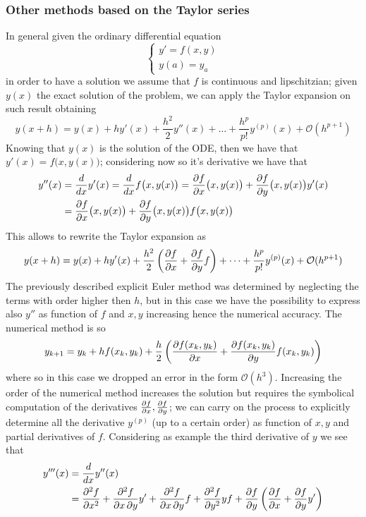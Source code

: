 	\subsubsection{Other methods based on the Taylor series}
		In general given the ordinary differential equation
		\[ \begin{cases}
			y' = f(x,y) \\ y(a) = y_a
		\end{cases} \]
		in order to have a solution we assume that $f$ is continuous and lipschitzian; given $y(x)$ the exact solution of the problem, we can apply the Taylor expansion on such result obtaining
		\[ y(x+h) = y(x) + h y'(x) + \frac{h^2}{2} y''(x) + \dots + \frac{h^p}{p!} y^{(p)} (x) + \mathcal O(h^{p+1}) \]
		Knowing that $y(x)$ is the solution of the ODE, then we have that $y'(x) = f\big(x,y(x)\big)$; considering now so it's derivative we have that
		\begin{align*}
			y''(x) & = \frac d{dx} y'(x)  = \frac d{dx} f\big(x,y(x)\big) = \frac{\partial f}{\partial x} \big(x,y(x)\big) + \frac{\partial f}{\partial y}\big(x,y(x)\big) y'(x) \\
			& = \frac{\partial f}{\partial x} \big(x,y(x)\big) + \frac{\partial f}{\partial y}\big(x,y(x)\big) f\big(x,y(x)\big)
		\end{align*}
		This allows to rewrite the Taylor expansion as
		\[ y(x+h) = y(x) + h y'(x) + \frac{h^2}{2} \left(\frac{\partial f}{\partial x} + \frac{\partial f}{\partial y} f \right) + \dots + \frac{h^p}{p!} y^{(p)} (x) + \mathcal O(h^{p+1}) \]
		The previously described explicit Euler method was determined by neglecting the terms with order higher then $h$, but in this case we have the possibility to express also $y''$ as function of $f$ and $x,y$ increasing hence the numerical accuracy. The numerical method is so
		\begin{equation} \label{eq:ode:eulersecond}
			y_{k+1} = y_k + h f(x_k,y_k) + \frac h 2 \left( \frac{\partial f(x_k,y_k)}{\partial x} + \frac{\partial f(x_k,y_k)}{\partial y} f(x_k,y_k) \right)
		\end{equation}
		where so in this case we dropped an error in the form $\mathcal O(h^3)$. Increasing the order of the numerical method increases the solution but requires the symbolical computation of the derivatives $\frac{\partial f}{\partial x},\frac{\partial f}{\partial y}$; we can carry on the process to explicitly determine all the derivative $y^{(p)}$ (up to a certain order) as function of $x,y$ and partial derivatives of $f$. Considering as example the third derivative of $y$ we see that
		\begin{align*}
			y'''(x) & = \frac{d}{dx} y''(x) \\ & 
			= \frac{\partial ^2 f}{\partial x^2} + \frac{\partial ^2f}{\partial x\, \partial y} y' + \frac{\partial ^2 f}{\partial x\,\partial y} f + \frac{\partial ^2f}{\partial y^2} y f + \frac{\partial f}{\partial y} \left( \frac{\partial f}{\partial x} + \frac{\partial f}{\partial y} y'\right)
		\end{align*}
